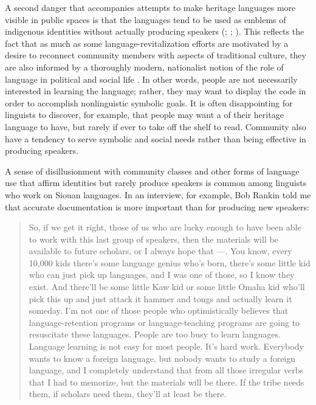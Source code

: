 \documentclass[output=paper]{LSP/langsci}
\begin{document}
A second danger that accompanies attempts to make heritage languages more visible in public spaces is that the languages tend to be used as emblems of indigenous identities without actually producing speakers (\citealt{Ahlers2006}; \citealt[98]{DauenhauerDauenhauer1998}; \citealt[715]{Whiteley2003}). This reflects the fact that as much as some language-revitalization efforts are motivated by a desire to reconnect community members with aspects of traditional culture, they are also informed by a thoroughly modern, nationalist notion of the role of language in political and social life \citep{KroskrityField2009, Nevins2013}. In other words, people are not necessarily interested in learning the language; rather, they may want to display the code in order to accomplish nonlinguistic symbolic goals. It is often disappointing for linguists to discover, for example, that people may want a  of their heritage language to have, but rarely if ever to take off the shelf to read. Community  also have a tendency to serve symbolic and social needs rather than being effective in producing speakers. 

A sense of disillusionment with community classes and other forms of language use that affirm identities but rarely produce speakers is common among linguists who work on Siouan languages. In an interview, for example, Bob Rankin told me that accurate documentation is more important than  for producing new speakers:

\begin{quote} So, if we get it right, those of us who are lucky enough to have been able to work with this last group of speakers, then the materials will be available to future scholars, or I always hope that ---. You know, every 10,000 kids there's some language genius who's born, there's some little kid who can just pick up languages, and I was one of those, so I know they exist. And there'll be some little Kaw kid or some little Omaha kid who'll pick this up and just attack it hammer and tongs and actually learn it someday. I'm not one of those people who optimistically believes that language-retention programs or language-teaching programs are going to resuscitate these languages. People are too busy to learn languages. Language learning is not easy for most people. It's hard work. Everybody wants to know a foreign language, but nobody wants to study a foreign language, and I completely understand that from all those  irregular verbs that I had to memorize, but the materials will be there. If the tribe needs them, if scholars need them, they'll at least be there.\end{quote}
\end{document}
